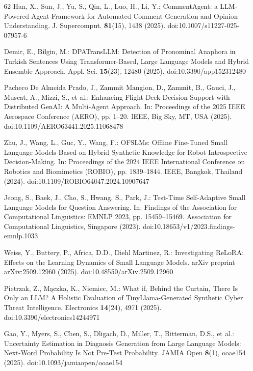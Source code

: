 \begin{thebibliography}{62}
Han, X., Sun, J., Yu, S., Qin, L., Luo, H., Li, Y.: CommentAgent: a LLM-Powered Agent Framework for Automated Comment Generation and Opinion Understanding. J. Supercomput. \textbf{81}(15), 1438 (2025). doi:10.1007/s11227-025-07957-6

Demir, E., Bilgin, M.: DPATransLLM: Detection of Pronominal Anaphora in Turkish Sentences Using Transformer-Based, Large Language Models and Hybrid Ensemble Approach. Appl. Sci. \textbf{15}(23), 12480 (2025). doi:10.3390/app152312480

Pacheco De Almeida Prado, J., Zammit Mangion, D., Zammit, B., Gauci, J., Muscat, A., Mizzi, S., et al.: Enhancing Flight Deck Decision Support with Distributed GenAI: A Multi-Agent Approach. In: Proceedings of the 2025 IEEE Aerospace Conference (AERO), pp. 1--20. IEEE, Big Sky, MT, USA (2025). doi:10.1109/AERO63441.2025.11068478

Zhu, J., Wang, L., Guc, Y., Wang, F.: OFSLMs: Offline Fine-Tuned Small Language Models Based on Hybrid Synthetic Knowledge for Robot Introspective Decision-Making. In: Proceedings of the 2024 IEEE International Conference on Robotics and Biomimetics (ROBIO), pp. 1839--1844. IEEE, Bangkok, Thailand (2024). doi:10.1109/ROBIO64047.2024.10907647

Jeong, S., Baek, J., Cho, S., Hwang, S., Park, J.: Test-Time Self-Adaptive Small Language Models for Question Answering. In: Findings of the Association for Computational Linguistics: EMNLP 2023, pp. 15459--15469. Association for Computational Linguistics, Singapore (2023). doi:10.18653/v1/2023.findings-emnlp.1033

Weiss, Y., Buttery, P., Africa, D.D., Diehl Martinez, R.: Investigating ReLoRA: Effects on the Learning Dynamics of Small Language Models. arXiv preprint arXiv:2509.12960 (2025). doi:10.48550/arXiv.2509.12960

Pietrzak, Z., Mączka, K., Niemiec, M.: What if, Behind the Curtain, There Is Only an LLM? A Holistic Evaluation of TinyLlama-Generated Synthetic Cyber Threat Intelligence. Electronics \textbf{14}(24), 4971 (2025). doi:10.3390/electronics14244971

Gao, Y., Myers, S., Chen, S., Dligach, D., Miller, T., Bitterman, D.S., et al.: Uncertainty Estimation in Diagnosis Generation from Large Language Models: Next-Word Probability Is Not Pre-Test Probability. JAMIA Open \textbf{8}(1), ooae154 (2025). doi:10.1093/jamiaopen/ooae154


\end{thebibliography}
